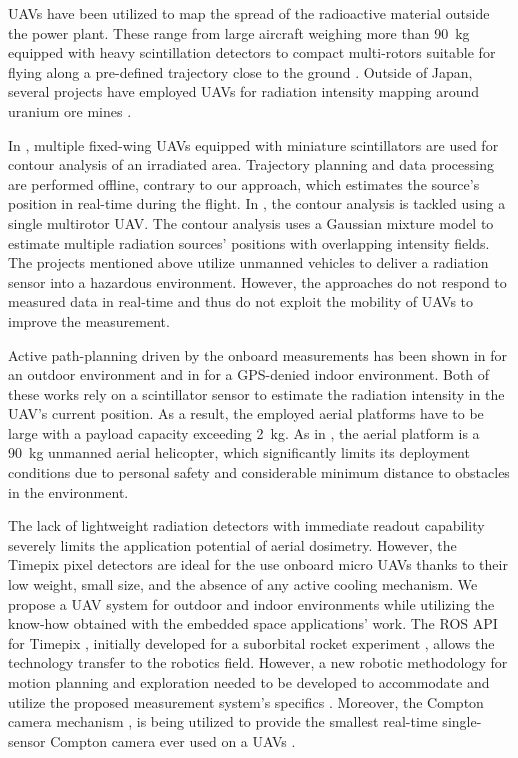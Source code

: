 \documentclass[a4paper,11pt,twoside,openright]{book}
\begin{document}
\acp{UAV} have been utilized to map the spread of the radioactive material outside the power plant.
These range from large aircraft weighing more than \SI{90}{\kilogram} equipped with heavy scintillation detectors \cite{sanada2015aerial, towler2012radiation, jiang2016prototype}
to compact multi-rotors suitable for flying along a pre-defined trajectory close to the ground \cite{macfarlane2014lightweight, christie2017radiation, martin20163d}.
Outside of Japan, several projects have employed \acp{UAV} for radiation intensity mapping around uranium ore mines \cite{salek2018mapping, keatley2018source, martin2015use}.

In \cite{han2013lowcost}, multiple fixed-wing \acp{UAV} equipped with miniature scintillators are used for contour analysis of an irradiated area.
Trajectory planning and data processing are performed offline, contrary to our approach, which estimates the source's position in real-time during the flight.
In \cite{newaz2016uav}, the contour analysis is tackled using a single multirotor \ac{UAV}. The contour analysis uses a Gaussian mixture model to estimate multiple radiation sources' positions with overlapping intensity fields.
The projects mentioned above utilize unmanned vehicles to deliver a radiation sensor into a hazardous environment.
However, the approaches do not respond to measured data in real-time and thus do not exploit the mobility of \acp{UAV} to improve the measurement.

Active path-planning driven by the onboard measurements has been shown in \cite{towler2012radiation} for an outdoor environment and in \cite{mascarich2018radiation} for a GPS-denied indoor environment.
Both of these works rely on a scintillator sensor to estimate the radiation intensity in the \ac{UAV}'s current position.
As a result, the employed aerial platforms have to be large with a payload capacity exceeding \SI{2}{\kilogram}.
As in \cite{towler2012radiation}, the aerial platform is a \SI{90}{\kilogram} unmanned aerial helicopter, which significantly limits its deployment conditions due to personal safety and considerable minimum distance to obstacles in the environment.

The lack of lightweight radiation detectors with immediate readout capability severely limits the application potential of aerial dosimetry.
However, the Timepix pixel detectors are ideal for the use onboard micro \acp{UAV} thanks to their low weight, small size, and the absence of any active cooling mechanism.
We propose a \ac{UAV} system for outdoor and indoor environments while utilizing the know-how obtained with the embedded space applications' work.
The \ac{ROS} \acs{API} for Timepix \cite{baca2018rospix}, initially developed for a suborbital rocket experiment \cite{urban2020rex}, allows the technology transfer to the robotics field.
However, a new robotic methodology for motion planning and exploration needed to be developed to accommodate and utilize the proposed measurement system's specifics \cite{stibinger2020localization}.
Moreover, the Compton camera mechanism \cite{turecek2018compton}, is being utilized to provide the smallest real-time single-sensor Compton camera ever used on a \acp{UAV} \cite{baca2020gamma}.
\end{document}
